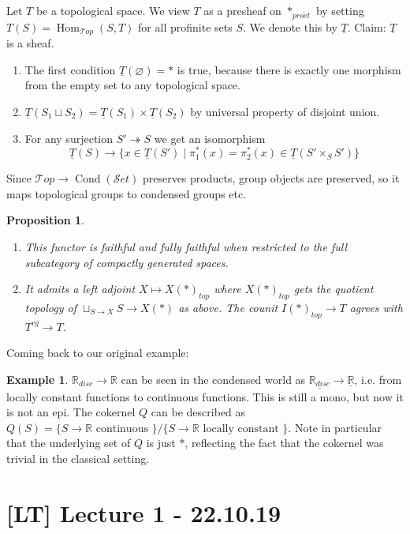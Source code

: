 \documentclass[11pt,A4]{article}
\theoremstyle{plain}
\newtheorem{prop}[thm]{Proposition}
\theoremstyle{definition}
\newtheorem{exa}[thm]{Example}
\theoremstyle{remark}
\newcommand{\1}{\mathbbm{1}}
\newcommand{\Top}{\mathscr{T}op}
\newcommand{\Set}{\mathscr{S}et}
\DeclareMathOperator{\Hom}{Hom}
\DeclareMathOperator{\Cond}{Cond}
\newcommand{\pe}{*_{pro\acute et}}
\renewcommand{\u}[1]{\underline{#1}}
\newcommand{\fp}[1]{\times_{#1}}
\begin{document}
Let $T$ be a topological space.
We view $T$ as a presheaf on $\pe$ by setting $T(S)=\Hom_{\Top}(S,T)$ for all profinite sets $S$.
We denote this by $\u{T}$.
Claim: $\u{T}$ is a sheaf.
\begin{enumerate}[label=\roman*)]
    \item The first condition $\u{T}(\varnothing)=*$ is true, because there is exactly one morphism from the empty set to any topological space.
    \item $\u{T}(S_{1}\sqcup S_{2})=\u{T}(S_{1})\times \u{T}(S_{2})$ by universal property of disjoint union.
    \item For any surjection $S'\twoheadrightarrow S$ we get an isomorphism
	\[ \u{T}(S)\to \{ x\in \u{T}(S')\mid \pi_{1}^{*}(x)=\pi_{2}^{*}(x)\in \u{T}(S'\fp{S}S')\}\]
\end{enumerate}

Since $\Top\to \Cond(\Set)$ preserves products, group objects are preserved, so it maps topological groups to condensed groups etc.

\begin{prop}
    \begin{enumerate}[label=\roman*)]
	\item This functor is faithful and fully faithful when restricted to the full subcategory of compactly generated spaces.
	\item It admits a left adjoint $X\mapsto X(*)_{top}$ where $X(*)_{top}$ gets the quotient topology of $\sqcup_{S\to X}S\to X(*)$ as above.
	    The counit $I(*)_{top}\to T$ agrees with $T^{cg}\to T$.
    \end{enumerate}
\end{prop}

Coming back to our original example:

\begin{exa}
    $\mathbb{R}_{disc}\to \mathbb{R}$ can be seen in the condensed world as $\u{\mathbb{R}_{disc}}\to \u{\mathbb{R}}$, i.e. from locally constant functions to continuous functions.
    This is still a mono, but now it is not an epi.
    The cokernel $Q$ can be described as $Q(S)=\{ S\to \mathbb{R}\text{ continuous }\}/\{ S\to \mathbb{R}\text{ locally constant }\}$.
    Note in particular that the underlying set of $Q$ is just $*$, reflecting the fact that the cokernel was trivial in the classical setting.
\end{exa}

\section{[LT] Lecture 1 - 22.10.19}
\end{document}
